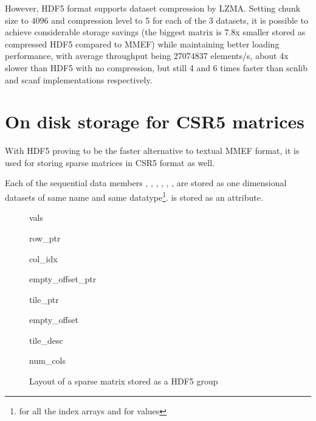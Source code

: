 \documentclass[thesis=M,english]{FITthesis}[2019/12/23]
\begin{document}
However, HDF5 format supports dataset compression by LZMA. Setting chunk size to 4096 and compression level to 5 for each of the 3 datasets,
it is possible to achieve considerable storage savings (the biggest matrix is 7.8x smaller stored as compressed HDF5 compared to MMEF)
while maintaining better loading performance, with average throughput being 27074837 elements/s, about 4x slower than HDF5 with no compression,
but still 4 and 6 times faster than scnlib and scanf implementations respectively.

\section{On disk storage for CSR5 matrices}\label{csr5:onDisk}

With HDF5 proving to be the faster alternative to textual MMEF format, it is used for storing sparse
matrices in CSR5 format as well.

Each of the sequential data members , , , ,
, , are stored as one dimensional datasets of same name
and same datatype\footnote{ for all the index arrays and  for values}.
 is stored as an attribute.

\begin{figure}[!h]
    \begin{tcolorbox}[title=/A, colback=gray!30!white]
        \begin{infobox}[colback=hdtsc]
            vals
        \end{infobox}
        \begin{infobox}[colback=hdtsc]
            row\_ptr
        \end{infobox}
        \begin{infobox}[colback=hdtsc]
            col\_idx
        \end{infobox}
        \begin{infobox}[colback=hdtsc, width=0.3\textwidth]
            empty\_offset\_ptr
        \end{infobox}
        \begin{infobox}[colback=hdtsc]
            tile\_ptr
        \end{infobox}
        \begin{infobox}[colback=hdtsc]
            empty\_offset
        \end{infobox}
        \begin{infobox}[colback=hdtsc]
            tile\_desc
        \end{infobox}
        \begin{infobox}[colback=hdatc, width=0.2\textwidth]
            num\_cols
        \end{infobox}
    \end{tcolorbox}
    \caption{Layout of a sparse matrix stored as a HDF5 group}
\end{figure}
\end{document}
